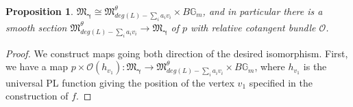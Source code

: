 \documentclass[12pt, oneside]{amsart}   	%
\newcounter{thm}
\newtheorem{proposition}[thm]{Proposition}
\numberwithin{equation}{section}
\numberwithin{thm}{section}
\numberwithin{figure}{section}
\begin{document}
\begin{proposition}\label{smooth}
$\mathfrak{M}_{\pmb\gamma}\cong\mathfrak{M}^\theta_{deg(L) -\sum_i a_iv_i} \times B\mathbb{G}_m$, and in particular there is a smooth section $\mathfrak{M}^\theta_{deg(L) -\sum_i a_iv_i} \rightarrow \mathfrak{M}_{\pmb\gamma} $ of $p$ with relative cotangent bundle $\mathcal{O}$. 
\end{proposition}

\begin{proof}
%
%
%
%
%
%
%

We construct maps going both direction of the desired isomorphism. First, we have a map $p \times \mathcal{O}(h_{v_1}): \mathfrak{M}_{\pmb\gamma}\rightarrow \mathfrak{M}^\theta_{deg(L) -\sum_i a_iv_i} \times B\mathbb{G}_m$, where $h_{v_1}$ is the universal PL function giving the position of the vertex $v_1$ specified in the construction of $f$.


\end{proof}
\end{document}
